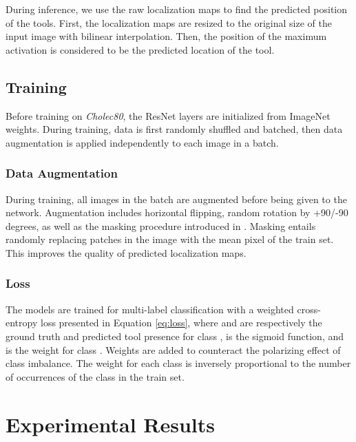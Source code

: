 \documentclass[english,runningheads,a4paper]{llncs}
\begin{document}
During inference, we use the raw localization maps to find the predicted position of the tools. First, the localization maps are resized to the original size of the input image with bilinear interpolation. Then, the position of the maximum activation is considered to be the predicted location of the tool.

\subsection{Training}
Before training on \textit{Cholec80}, the ResNet layers are initialized from ImageNet weights. During training, data is first randomly shuffled and batched, then data augmentation is applied independently to each image in a batch.

\subsubsection{Data Augmentation}
During training, all images in the batch are augmented before being given to the network. Augmentation includes horizontal flipping, random rotation by +90/-90 degrees, as well as the masking procedure introduced in \cite{singh:iccv2017}. Masking entails randomly replacing patches in the image with the mean pixel of the train set. This improves the quality of predicted localization maps.
\subsubsection{Loss}
The models are trained for multi-label classification with a weighted cross-entropy loss  presented in Equation \ref{eq:loss}, where  and  are respectively the ground truth and predicted tool presence for class ,  is the sigmoid function, and  is the weight for class . Weights are added to counteract the polarizing effect of class imbalance. The weight for each class is inversely proportional to the number of occurrences of the class in the train set.



\section{Experimental Results}
\end{document}
